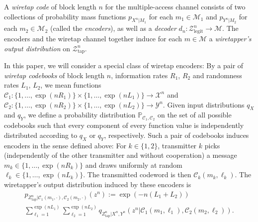 \documentclass[journal]{IEEEtran}
\newcommand{\channelpmf}{q}
\newcommand{\codebookpmf}{p}
\newcommand{\codebookRate}{R}
\newcommand{\codebookRateOne}{R_1}
\newcommand{\codebookRateTwo}{R_2}
\newcommand{\channelInOne}{X}
\newcommand{\channelInOneAlph}{\mathcal{X}}
\newcommand{\channelInTwo}{Y}
\newcommand{\channelInTwoAlph}{\mathcal{Y}}
\newcommand{\channelOut}{Z}
\newcommand{\channelOutAlph}{\mathcal{Z}}
\newcommand{\channelOutAlphElement}{z}
\newcommand{\channelOutAlphWiretapper}{\channelOutAlph_\mathrm{tap}}
\newcommand{\channelOutAlphElementWiretapper}{\channelOutAlphElement}
\newcommand{\channelOutAlphLegit}{\channelOutAlph_\mathrm{legit}}
\newcommand{\channelOutWiretapper}{\channelOut_\mathrm{tap}}
\newcommand{\codebook}{\mathcal{C}}
\newcommand{\codebookOne}{\mathcal{C}_1}
\newcommand{\codebookTwo}{\mathcal{C}_2}
\newcommand{\codewordIndex}{m}
\newcommand{\codebookBlocklength}{n}
\newcommand{\txIndex}{k}
\newcommand{\Probability}{\mathbb{P}}
\newcommand{\codebookDecoder}{d}
\newcommand{\messageRV}{M}
\newcommand{\messageAlphabet}{\mathcal{M}}
\newcommand{\messageAlphabetElement}{m}
\newcommand{\codebookRandRate}{{L}}
\newcommand{\codebookRandRateOne}{{L_1}}
\newcommand{\codebookRandRateTwo}{{L_2}}
\newcommand{\randomnessIndex}{\ell}
\begin{document}
A \emph{wiretap code} of block length $\codebookBlocklength$ for the multiple-access channel consists of two collections of probability mass functions $\codebookpmf_{\channelInOne^\codebookBlocklength | \messageRV_1}$ for each $\messageAlphabetElement_1 \in \messageAlphabet_1$ and $\codebookpmf_{\channelInTwo^\codebookBlocklength | \messageRV_2}$ for each $\messageAlphabetElement_2 \in \messageAlphabet_2$ (called the \emph{encoders}), as well as a \emph{decoder} $\codebookDecoder_\codebookBlocklength: \channelOutAlphLegit^\codebookBlocklength \rightarrow \messageAlphabet$. The encoders and the wiretap channel together induce for each $\messageAlphabetElement \in \messageAlphabet$ a \emph{wiretapper's output distribution} on $\channelOutAlphWiretapper^\codebookBlocklength$.

In this paper, we will consider a special class of wiretap encoders: By a pair of \emph{wiretap codebooks} of block length $\codebookBlocklength$, information rates $\codebookRateOne$, $\codebookRateTwo$ and randomness rates $\codebookRandRateOne$, $\codebookRandRateTwo$, we mean functions $\codebookOne: \{1, \dots, \exp(\codebookBlocklength\codebookRateOne)\} \times \{1, \dots, \exp(\codebookBlocklength\codebookRandRateOne)\} \rightarrow \channelInOneAlph^\codebookBlocklength$ and $\codebookTwo: \{1, \dots, \exp(\codebookBlocklength\codebookRateTwo)\} \times \{1, \dots, \exp(\codebookBlocklength\codebookRandRateTwo)\} \rightarrow \channelInTwoAlph^\codebookBlocklength$. Given input distributions $\channelpmf_\channelInOne$ and $\channelpmf_\channelInTwo$, we define a probability distribution $\Probability_{\codebookOne, \codebookTwo}$ on the set of all possible codebooks such that every component of every function value is independently distributed according to $\channelpmf_\channelInOne$ or $\channelpmf_\channelInTwo$, respectively. Such a pair of codebooks induces encoders in the sense defined above: For $\txIndex \in \{1,2\}$, transmitter $\txIndex$ picks (independently of the other transmitter and without cooperation) a message $\codewordIndex_\txIndex \in \{1, \dots, \exp(\codebookBlocklength\codebookRate_\txIndex)\}$ and draws uniformly at random $\randomnessIndex_\txIndex \in \{1, \dots, \exp(\codebookBlocklength\codebookRandRate_\txIndex)\}$. The transmitted codeword is then $\codebook_\txIndex(\codewordIndex_\txIndex, \randomnessIndex_\txIndex)$. The wiretapper's output distribution induced by these encoders is
\begin{multline*}
\codebookpmf_{\channelOutWiretapper^\codebookBlocklength | \codebookOne(\codewordIndex_1, \cdot), \codebookTwo(\codewordIndex_2, \cdot)}(\channelOutAlphElementWiretapper^\codebookBlocklength)
:=
\exp(-\codebookBlocklength(\codebookRandRateOne+\codebookRandRateTwo))
\\
\sum\limits_{\randomnessIndex_1=1}^{\exp(\codebookBlocklength\codebookRandRateOne)}
\sum\limits_{\randomnessIndex_2=1}^{\exp(\codebookBlocklength\codebookRandRateTwo)}
  \channelpmf_{\channelOutWiretapper^\codebookBlocklength | \channelInOne^\codebookBlocklength, \channelInTwo^\codebookBlocklength} (\channelOutAlphElementWiretapper^\codebookBlocklength | \codebookOne(\codewordIndex_1, \randomnessIndex_1), \codebookTwo(\codewordIndex_2, \randomnessIndex_2)).
\end{multline*}
\end{document}

